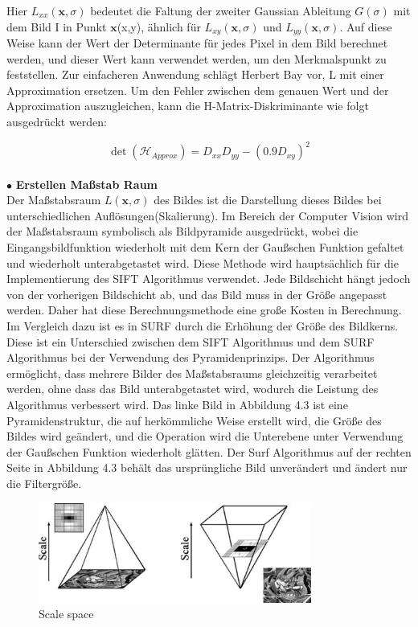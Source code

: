 Hier $L_{xx}(\textbf{x},\sigma)$ bedeutet die Faltung der zweiter Gaussian Ableitung $G(\sigma)$ mit dem Bild I in Punkt $\textbf{x}$(x,y), ähnlich für $L_{xy}(\textbf{x},\sigma)$ und $L_{yy}(\textbf{x},\sigma)$. Auf diese Weise kann der Wert der Determinante für jedes Pixel in dem Bild berechnet werden, und dieser Wert kann verwendet werden, um den Merkmalspunkt zu feststellen.
Zur einfacheren Anwendung schlägt Herbert Bay\cite{Surf} vor, L mit einer Approximation ersetzen. Um den Fehler zwischen dem genauen Wert und der Approximation auszugleichen, kann die H-Matrix-Diskriminante wie folgt ausgedrückt werden:

\begin{equation}
   \det(\mathcal{H}_{Approx}) = D_{xx}D_{yy} - (0.9D_{xy})^2  
\end{equation}
\\
$\bullet$ \textbf{Erstellen Maßstab Raum}\\
Der Maßstabsraum $L(\textbf{x},\sigma)$ des Bildes ist die Darstellung dieses Bildes bei unterschiedlichen Auflösungen(Skalierung). Im Bereich der Computer Vision wird der Maßstabsraum symbolisch als Bildpyramide ausgedrückt, wobei die Eingangsbildfunktion wiederholt mit dem Kern der Gaußschen Funktion gefaltet und wiederholt unterabgetastet wird. Diese Methode wird hauptsächlich für die Implementierung des SIFT Algorithmus verwendet. Jede Bildschicht hängt jedoch von der vorherigen Bildschicht ab, und das Bild muss in der Größe angepasst werden. Daher hat diese Berechnungsmethode eine große Kosten in Berechnung. Im Vergleich dazu ist es in SURF durch die Erhöhung der Größe des Bildkerns. Diese ist ein Unterschied zwischen dem SIFT Algorithmus und dem SURF Algorithmus bei der Verwendung des Pyramidenprinzips.
Der Algorithmus ermöglicht, dass mehrere Bilder des Maßstabsraums gleichzeitig verarbeitet werden, ohne dass das Bild unterabgetastet wird, wodurch die Leistung des Algorithmus verbessert wird. Das linke Bild in Abbildung 4.3 ist eine Pyramidenstruktur, die auf herkömmliche Weise erstellt wird, die Größe des Bildes wird geändert, und die Operation wird die Unterebene  unter Verwendung der Gaußschen Funktion wiederholt glätten. Der Surf Algorithmus auf der rechten Seite in Abbildung 4.3 behält das ursprüngliche Bild unverändert und ändert nur die Filtergröße.

\begin{figure}[htb]
 \centering 
 \includegraphics[keepaspectratio,width=0.8\textwidth]{images/3_Ersteverfahren/Scale_space.pdf}
 \caption{Scale space}
 \label{fig:Scale space}
\end{figure} 


